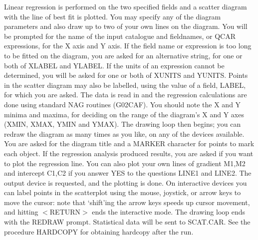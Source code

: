 Linear regression is performed on the two specified fields and a scatter 
diagram with the line of best fit is plotted. 
You may specify any of the diagram parameters and also draw up to two of
your own lines on the diagram.
You will be prompted for the name of the input catalogue and fieldnames, or 
QCAR expressions, for the X axis and Y axis.  
If the field name or expression is too long to be fitted on the diagram, you 
are asked for an alternative string, for one or both of XLABEL and YLABEL.  
If the units of an expression cannot be determined, you will be asked for one 
or both of XUNITS and YUNITS.  
Points in the scatter diagram may also be labelled, using the value of a 
field, LABEL, for which you are asked.
The data is read in and the regression calculations are done using standard 
NAG routines (G02CAF).  
You should note the X and Y minima and maxima, for deciding on the range of 
the diagram's X and Y axes (XMIN, XMAX, YMIN and YMAX).
The drawing loop then begins; you can redraw the diagram as many times as you 
like, on any of the devices available.
You are asked for the diagram title and a MARKER character for points to mark 
each object.
If the regression analysis produced results, you are asked if you want to plot 
the regression line.  
You can also plot your own lines of gradient M1,M2 and intercept C1,C2 if 
you answer YES to the questions LINE1 and LINE2.
The output device is requested, and the plotting is done.  
On interactive devices you can label points in the scatterplot using the 
mouse, joystick, or arrow keys to move the cursor: note that `shift'ing the 
arrow keys speeds up cursor movement, and hitting $<$RETURN$>$ ends the
interactive mode.
The drawing loop ends with the REDRAW prompt.
Statistical data will be sent to SCAT.CAR.  
See the procedure HARDCOPY for obtaining hardcopy after the run.
